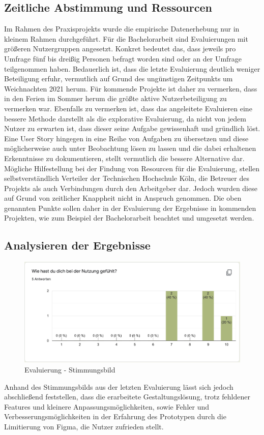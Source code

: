 \subsection{Zeitliche Abstimmung und Ressourcen}
Im Rahmen des Praxisprojekts wurde die empirische Datenerhebung nur in kleinem Rahmen durchgeführt. Für die Bachelorarbeit sind Evaluierungen mit größeren Nutzergruppen angesetzt. Konkret bedeutet das, dass jeweils pro Umfrage fünf bis dreißig Personen befragt worden sind oder an der Umfrage teilgenommen haben. Bedauerlich ist, dass die letzte Evaluierung deutlich weniger Beteiligung erfuhr, vermutlich auf Grund des ungünstigen Zeitpunkts um Weichnachten 2021 herum. Für kommende Projekte ist daher zu vermerken, dass in den Ferien im Sommer herum die größte aktive Nutzerbeteiligung zu vermerken war. Ebenfalls zu vermerken ist, dass das angeleitete Evaluieren eine bessere Methode darstellt als die explorative Evaluierung, da nicht von jedem Nutzer zu erwarten ist, dass dieser seine Aufgabe gewissenhaft und gründlich löst. Eine User Story hingegen in eine Reihe von Aufgaben zu übersetzen und diese möglicherweise auch unter Beobachtung lösen zu lassen und die dabei erhaltenen Erkenntnisse zu dokumentieren, stellt vermutlich die bessere Alternative dar. Mögliche Hilfestellung bei der Findung von Resourcen für die Evaluierung, stellen selbstverständlich Verteiler der Technischen Hochschule Köln, die Betreuer des Projekts als auch Verbindungen durch den Arbeitgeber dar. Jedoch wurden diese auf Grund von zeitlicher Knappheit nicht in Anspruch genommen. Die oben genannten Punkte sollen daher in der Evaluierung der Ergebnisse in kommenden Projekten, wie zum Beispiel der Bachelorarbeit beachtet und umgesetzt werden. \\

\subsection{Analysieren der Ergebnisse}
\begin{figure}[h] %
    \includegraphics[width=1\textwidth]{images/Stimmungsbild.png}
    \caption[Evaluierung - Stimmungsbild]{Evaluierung - Stimmungsbild}
    \label{fig:EvaluierungStimmungsbild}
\end{figure}
Anhand des Stimmungsbilds aus der letzten Evaluierung lässt sich jedoch abschließend feststellen, dass die erarbeitete Gestaltungslösung, trotz fehldener Features und kleinere Anpassungsmöglichkeiten, sowie Fehler und Verbesserungsmöglichkeiten in der Erfahrung des Prototypen durch die Limitierung von Figma, die Nutzer zufrieden stellt.
